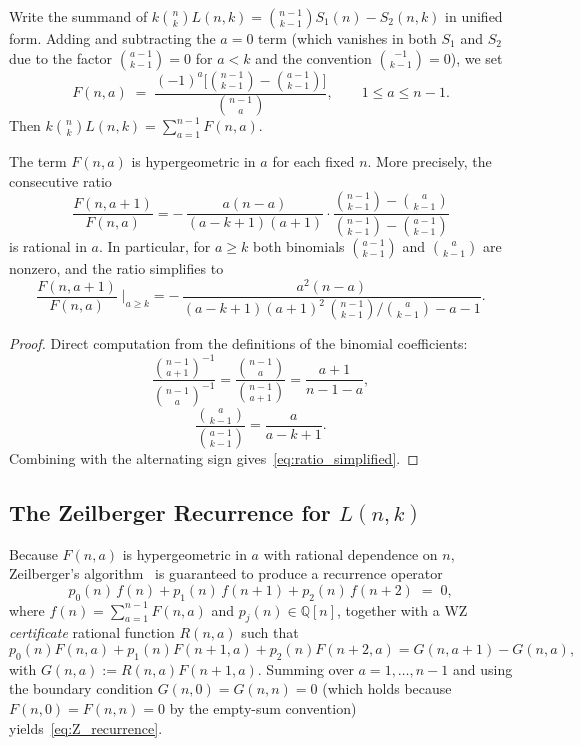 Write the summand of $k\binom{n}{k}L(n,k)=\binom{n-1}{k-1}S_1(n)-S_2(n,k)$
in unified form.  Adding and subtracting the $a=0$ term (which vanishes in
both $S_1$ and $S_2$ due to the factor $\binom{a-1}{k-1}=0$ for $a<k$ and
the convention $\binom{-1}{k-1}=0$), we set
\[
  F(n,a)
  \;=\;
  \frac{(-1)^a\bigl[\binom{n-1}{k-1}-\binom{a-1}{k-1}\bigr]}
       {\binom{n-1}{a}},
  \qquad 1\le a\le n-1.
\]
Then $k\binom{n}{k}L(n,k)=\sum_{a=1}^{n-1}F(n,a)$.

\begin{lemma}\label{lem:gosper_form}
The term $F(n,a)$ is hypergeometric in $a$ for each fixed $n$.  More
precisely, the consecutive ratio
\[
  \frac{F(n,a+1)}{F(n,a)}
  = -\,\frac{a(n-a)}{(a-k+1)(a+1)}\cdot
    \frac{\binom{n-1}{k-1}-\binom{a}{k-1}}
         {\binom{n-1}{k-1}-\binom{a-1}{k-1}}
\]
is rational in $a$.  In particular, for $a\ge k$ both binomials
$\binom{a-1}{k-1}$ and $\binom{a}{k-1}$ are nonzero, and the ratio simplifies
to
\begin{equation}\label{eq:ratio_simplified}
  \frac{F(n,a+1)}{F(n,a)}
  \;\Big|_{a\ge k}
  = -\,\frac{a^2(n-a)}{(a-k+1)(a+1)^2\,\binom{n-1}{k-1}/\binom{a}{k-1}-a-1}.
\end{equation}
\end{lemma}
\begin{proof}
Direct computation from the definitions of the binomial coefficients:
\[
  \frac{\binom{n-1}{a+1}^{-1}}{\binom{n-1}{a}^{-1}}
  = \frac{\binom{n-1}{a}}{\binom{n-1}{a+1}}
  = \frac{a+1}{n-1-a},
\]
\[
  \frac{\binom{a}{k-1}}{\binom{a-1}{k-1}}
  = \frac{a}{a-k+1}.
\]
Combining with the alternating sign gives~\eqref{eq:ratio_simplified}.
\end{proof}

\subsection{The Zeilberger Recurrence for \texorpdfstring{$L(n,k)$}{L(n,k)}}

Because $F(n,a)$ is hypergeometric in $a$ with rational dependence on $n$,
Zeilberger's algorithm~\cite{Zeilberger1991,PetkovsekWilfZeilberger} is
guaranteed to produce a recurrence operator
\begin{equation}\label{eq:Z_recurrence}
  p_0(n)\,f(n) + p_1(n)\,f(n+1) + p_2(n)\,f(n+2) \;=\; 0,
\end{equation}
where $f(n)=\sum_{a=1}^{n-1}F(n,a)$ and $p_j(n)\in\mathbb{Q}[n]$, together
with a WZ \emph{certificate} rational function $R(n,a)$ such that
\[
  p_0(n)F(n,a)+p_1(n)F(n+1,a)+p_2(n)F(n+2,a)
  = G(n,a+1)-G(n,a),
\]
with $G(n,a):=R(n,a)F(n+1,a)$.  Summing over $a=1,\ldots,n-1$ and using the
boundary condition $G(n,0)=G(n,n)=0$ (which holds because $F(n,0)=F(n,n)=0$
by the empty-sum convention) yields~\eqref{eq:Z_recurrence}.

